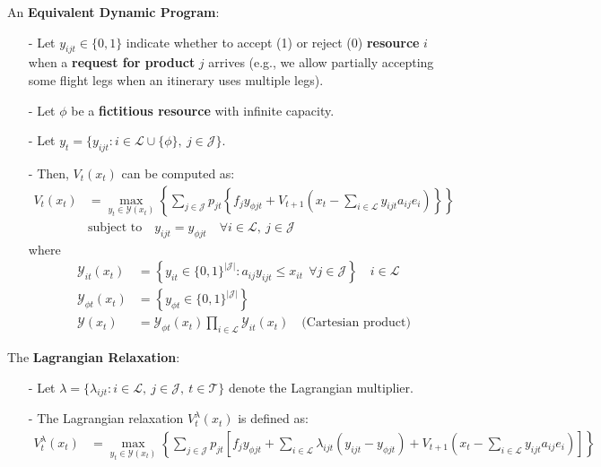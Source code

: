\documentclass[11pt]{article}
\begin{document}
\noindent
An \textbf{Equivalent Dynamic Program}:
\begin{itemize}[itemsep=0pt,parsep=0pt]
\item[-] Let $y_{ijt}\in\{0,1\}$ indicate whether to accept (1) or reject (0) \textbf{resource} $i$ when a \textbf{request for product} $j$ arrives (e.g., we allow partially accepting some flight legs when an itinerary uses multiple legs).
\item[-] Let $\phi$ be a \textbf{fictitious resource} with infinite capacity. 
\item[-] Let $y_t = \{y_{ijt} : i \in \mathcal{L} \cup \{\phi\}, \ j \in \mathcal{J}\}$.
\item[-] Then, $V_t(x_t)$ can be computed as:
    \begin{align*}
        V_t(x_t) &= \max_{y_t \in \mathcal{Y}(x_t)}
            \left\{ \sum_{j\in \mathcal{J}} p_{jt} 
            \left\{ 
                f_j y_{\phi jt} + 
                V_{t+1} \left(x_t - \sum_{i\in \mathcal{L}}y_{ijt}a_{ij}e_i\right) 
            \right\} \right\}
        \tag{DP2} \\
        & \text{subject to} \quad y_{ijt} = y_{\phi jt} \quad \forall i \in \mathcal{L}, \ j \in \mathcal{J}
    \end{align*}
    where
    \begin{align*}
        \mathcal{Y}_{it}(x_t) &= \left\{ 
            y_{it} \in \{0,1\}^{|\mathcal{J}|} : 
            a_{ij} y_{ijt} \leq x_{it} \ \ 
            \forall j \in \mathcal{J} 
        \right\} \quad i \in \mathcal{L} \\
        \mathcal{Y}_{\phi t}(x_t) &= \left\{ 
            y_{\phi t} \in \{0,1\}^{|\mathcal{J}|} 
        \right\} \\
        \mathcal{Y}(x_t) &= \mathcal{Y}_{\phi t}(x_t) \prod_{i \in \mathcal{L}} \mathcal{Y}_{it}(x_t) \quad \text{(Cartesian product)}
    \end{align*}
\end{itemize}

\vspace{0.5cm}

\noindent
The \textbf{Lagrangian Relaxation}:
\begin{itemize}[itemsep=0pt,parsep=0pt]
\item[-] Let $\lambda = \{\lambda_{ijt} : i \in \mathcal{L}, \ j \in \mathcal{J}, \ t \in \mathcal{T}\}$ denote the Lagrangian multiplier. 
\item[-] The Lagrangian relaxation $V^{\lambda}_t(x_t)$ is defined as:
    \begin{align*}
        V^{\lambda}_t(x_t) &= \max_{y_t \in \mathcal{Y}(x_t)} 
            \left\{ \sum_{j\in \mathcal{J}} p_{jt} 
            \left[ 
                f_j y_{\phi jt} +
                \sum_{i \in \mathcal{L}} \lambda_{ijt} (y_{ijt} - y_{\phi jt}) + 
                V_{t+1} \left(x_t - \sum_{i\in \mathcal{L}}y_{ijt}a_{ij}e_i\right) 
            \right] \right\}
            \tag{LR} \\
    \end{align*}
\end{itemize}
\end{document}
